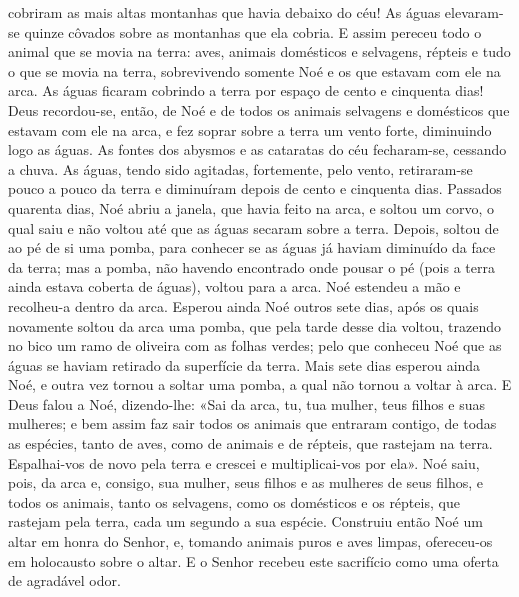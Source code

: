 \begin{paracol}{2}
{cobriram as mais altas montanhas que havia debaixo do céu! As águas elevaram-se quinze côvados sobre as montanhas que ela cobria. E assim pereceu todo o animal que se movia na terra: aves, animais domésticos e selvagens, répteis e tudo o que se movia na terra, sobrevivendo somente Noé e os que estavam com ele na arca. As águas ficaram cobrindo a terra por espaço de cento e cinquenta dias! Deus recordou-se, então, de Noé e de todos os animais selvagens e domésticos que estavam com ele na arca, e fez soprar sobre a terra um vento forte, diminuindo logo as águas. As fontes dos abysmos e as cataratas do céu fecharam-se, cessando a chuva. As águas, tendo sido agitadas, fortemente, pelo vento, retiraram-se pouco a pouco da terra e diminuíram depois de cento e cinquenta dias. Passados quarenta dias, Noé abriu a janela, que havia feito na arca, e soltou um corvo, o qual saiu e não voltou até que as águas secaram sobre a terra. Depois, soltou de ao pé de si uma pomba, para conhecer se as águas já haviam diminuído da face da terra; mas a pomba, não havendo encontrado onde pousar o pé (pois a terra ainda estava coberta de águas), voltou para a arca. Noé estendeu a mão e recolheu-a dentro da arca. Esperou ainda Noé outros sete dias, após os quais novamente soltou da arca uma pomba, que pela tarde desse dia voltou, trazendo no bico um ramo de oliveira com as folhas verdes; pelo que conheceu Noé que as águas se haviam retirado da superfície da terra. Mais sete dias esperou ainda Noé, e outra vez tornou a soltar uma pomba, a qual não tornou a voltar à arca. E Deus falou a Noé, dizendo-lhe: «Sai da arca, tu, tua mulher, teus filhos e suas mulheres; e bem assim faz sair todos os animais que entraram contigo, de todas as espécies, tanto de aves, como de animais e de répteis, que rastejam na terra. Espalhai-vos de novo pela terra e crescei e multiplicai-vos por ela». Noé saiu, pois, da arca e, consigo, sua mulher, seus filhos e as mulheres de seus filhos, e todos os animais, tanto os selvagens, como os domésticos e os répteis, que rastejam pela terra, cada um segundo a sua espécie. Construiu então Noé um altar em honra do Senhor, e, tomando animais puros e aves limpas, ofereceu-os em holocausto sobre o altar. E o Senhor recebeu este sacrifício como uma oferta de agradável odor.
}\switchcolumn*{}\switchcolumn{}\switchcolumn*\latim{
}
\end{paracol}
